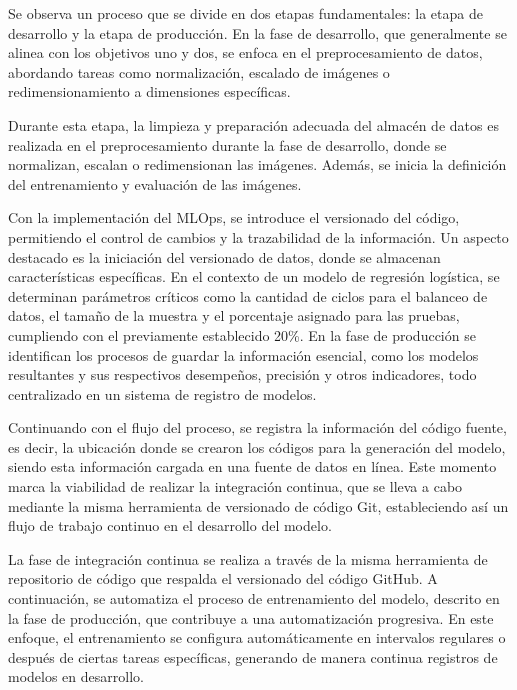 \newpage

Se observa un proceso que se divide en dos etapas fundamentales: la etapa de desarrollo y la etapa de producción. En la fase de desarrollo, que generalmente se alinea con los objetivos uno y dos, se enfoca en el preprocesamiento de datos, abordando tareas como normalización, escalado de imágenes o redimensionamiento a dimensiones específicas. \newline

Durante esta etapa, la limpieza y preparación adecuada del almacén de datos es realizada en el preprocesamiento durante la fase de desarrollo, donde se normalizan, escalan o redimensionan las imágenes. Además, se inicia la definición del entrenamiento y evaluación de las imágenes.

Con la implementación del MLOps, se introduce el versionado del código, permitiendo el control de cambios y la trazabilidad de la información. Un aspecto destacado es la iniciación del versionado de datos, donde se almacenan características específicas. En el contexto de un modelo de regresión logística, se determinan parámetros críticos como la cantidad de ciclos para el balanceo de datos, el tamaño de la muestra y el porcentaje asignado para las pruebas, cumpliendo con el previamente establecido 20\%. En la fase de producción se identifican los procesos de guardar la información esencial, como los modelos resultantes y sus respectivos desempeños, precisión y otros indicadores, todo centralizado en un sistema de registro de modelos. \newline

Continuando con el flujo del proceso, se registra la información del código fuente, es decir, la ubicación donde se crearon los códigos para la generación del modelo, siendo esta información cargada en una fuente de datos en línea. Este momento marca la viabilidad de realizar la integración continua, que se lleva a cabo mediante la misma herramienta de versionado de código Git, estableciendo así un flujo de trabajo continuo en el desarrollo del modelo. \newline

La fase de integración continua se realiza a través de la misma herramienta de repositorio de código que respalda el versionado del código GitHub. A continuación, se automatiza el proceso de entrenamiento del modelo, descrito en la fase de producción, que contribuye a una automatización progresiva. En este enfoque, el entrenamiento se configura automáticamente en intervalos regulares o después de ciertas tareas específicas, generando de manera continua registros de modelos en desarrollo.

